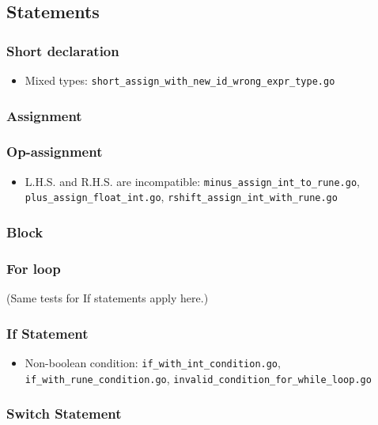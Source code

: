 \documentclass{article}
\begin{document}
\subsection*{Statements}

\subsubsection*{Short declaration}

\begin{itemize}
\item Mixed types: \texttt{short_assign_with_new_id_wrong_expr_type.go}
\end{itemize}

\subsubsection*{Assignment}
\subsubsection*{Op-assignment}

\begin{itemize}
\item L.H.S. and R.H.S. are incompatible: \texttt{minus_assign_int_to_rune.go}, \texttt{plus_assign_float_int.go}, \texttt{rshift_assign_int_with_rune.go}
\end{itemize}

\subsubsection*{Block}
\subsubsection*{For loop}

(Same tests for If statements apply here.)

\subsubsection*{If Statement}

\begin{itemize}
\item Non-boolean condition: \texttt{if_with_int_condition.go}, \texttt{if_with_rune_condition.go}, \texttt{invalid_condition_for_while_loop.go}
\end{itemize}

\subsubsection*{Switch Statement}
\end{document}
